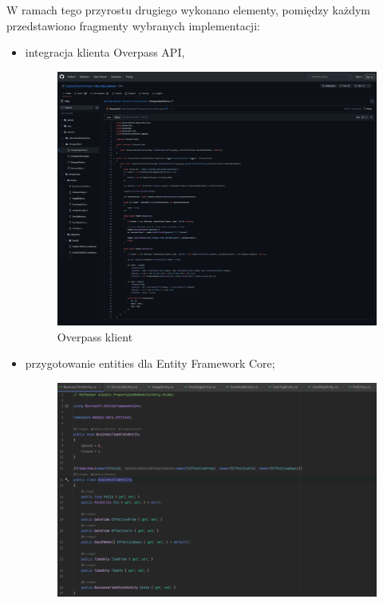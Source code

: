     W ramach tego przyrostu drugiego wykonano elementy, pomiędzy każdym przedstawiono fragmenty wybranych implementacji:
    \begin{itemize}
        \item integracja klienta Overpass API,
        \begin{figure}[H]
            \centering
            \includegraphics[width=1\textwidth]{attachments/overpassclient}
            \caption{Overpass klient}
            \label{fig:figure4}
            \end{figure}
        \item przygotowanie entities dla Entity Framework Core;
        \begin{figure}[H]
            \centering
            \includegraphics[width=1\textwidth]{attachments/Entity}

\end{figure}
\end{itemize}
